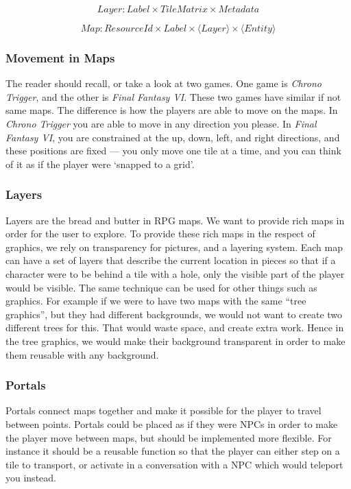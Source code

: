 \begin{equation}
Layer\colon Label \times TileMatrix \times Metadata
\end{equation}

\begin{equation}
Map\colon ResourceId \times Label \times \langle Layer \rangle \times \langle Entity \rangle
\end{equation}

\subsubsection{Movement in Maps}

The reader should recall, or take a look at two games. One game is 
\textit{Chrono Trigger}, and the other is \textit{Final Fantasy VI}. These two
games have similar if not same maps. The difference is how the players are able
to move on the maps. In \textit{Chrono Trigger} you are able to move in any
direction you please. In \textit{Final Fantasy VI}, you are constrained at the
up, down, left, and right directions, and these positions are fixed --- you only
move one tile at a time, and you can think of it as if the player were `snapped
to a grid'.

\subsubsection{Layers}

Layers are the bread and butter in RPG maps. We want to provide rich maps in
order for the user to explore. To provide these rich maps in the respect of
graphics, we rely on transparency for pictures, and a layering system. Each
map can have a set of layers that describe the current location in pieces so
that if a character were to be behind a tile with a hole, only the visible part
of the player would be visible. The same technique can be used for other things
such as graphics. For example if we were to have two maps with the same ``tree
graphics'', but they had different backgrounds, we would not want to create two
different trees for this. That would waste space, and create extra work. Hence
in the tree graphics, we would make their background transparent in order to
make them reusable with any background.

\subsubsection{Portals}

Portals connect maps together and make it possible for the player to travel
between points. Portals could be placed as if they were NPCs in order to make
the player move between maps, but should be implemented more flexible. For
instance it should be a reusable function so that the player can either step
on a tile to transport, or activate in a conversation with a NPC which would
teleport you instead.

